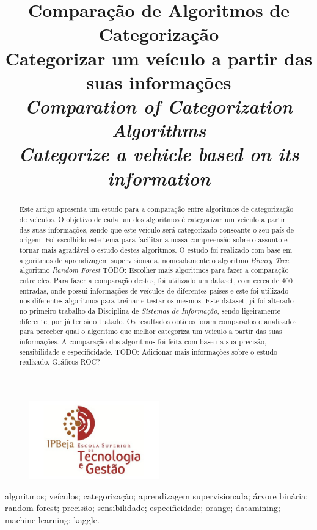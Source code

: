 \documentclass[conference]{IEEEtran}
\title{Comparação de Algoritmos de Categorização \\ \large Categorizar um veículo a partir das suas informações \\
\textit{Comparation of Categorization Algorithms \\ \large Categorize a vehicle based on its information}}
\author{
\IEEEauthorblockN{Martinho Caeiro - 23917 || Paulo Abade - 23919}
\IEEEauthorblockA{
    Instituto Politécnico de Beja\\
    Escola Superior de Tecnologia e Gestão\\
    Beja, Portugal\\
    23917@stu.ipbeja.pt || 23919@stu.ipbeja.pt
}
}
\begin{document}
\maketitle
\begin{figure}[!ht]
    \centering
    \includegraphics[width=0.5\textwidth]{Resources/Logo/IPBejaESTIG.jpg}
\end{figure}

\begin{abstract}
Este artigo apresenta um estudo para a comparação entre algoritmos de categorização de veículos. O objetivo de cada um dos 
algoritmos é categorizar um veículo a partir das suas informações, sendo que este veículo será categorizado consoante o seu 
país de origem. Foi escolhido este tema para facilitar a nossa compreensão sobre o assunto e tornar mais agradável o estudo
destes algoritmos. O estudo foi realizado com base em algoritmos de aprendizagem supervisionada, nomeadamente o algoritmo
\textit{Binary Tree}, algoritmo \textit{Random Forest} TODO: Escolher mais algoritmos para fazer a comparação entre eles. 
Para fazer a comparação destes, foi utilizado um dataset, com cerca de 400 entradas, onde possui informações de veículos de 
diferentes países e este foi utilizado nos diferentes algoritmos para treinar e testar os mesmos. Este dataset, já foi alterado 
no primeiro trabalho da Disciplina de \textit{Sistemas de Informação}, sendo ligeiramente diferente, por já ter sido tratado. 
Os resultados obtidos foram comparados e analisados para perceber qual o algoritmo que melhor categoriza um veículo a partir das 
suas informações. A comparação dos algoritmos foi feita com base na sua precisão, sensibilidade e especificidade. TODO: Adicionar 
mais informações sobre o estudo realizado. Gráficos ROC?
\end{abstract}

\begin{IEEEkeywords}
algoritmos; veículos; categorização; aprendizagem supervisionada; árvore binária; random forest; precisão; sensibilidade; especificidade;
orange; datamining; machine learning; kaggle.
\end{IEEEkeywords}
\end{document}

